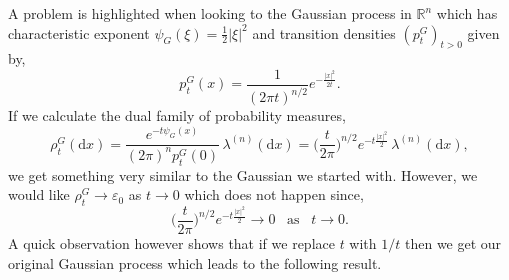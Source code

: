 \documentclass[a4paper, 12pt]{report}
\theoremstyle{remark}
\theoremstyle{definition}
\begin{document}
A problem is highlighted when looking to the Gaussian process in $\mathbb{R}^n$ which has characteristic exponent $\psi_G(\xi) = \frac{1}{2}|\xi|^2$ and transition densities $(p_t^G)_{t > 0}$ given by,
$$
p_t^G(x) = \frac{1}{(2\pi t)^{n/2}}e^{-\frac{|x|^2}{2t}}.
$$
If we calculate the dual family of probability measures,
$$
\rho_t^G(\mathrm{d}x) = \frac{e^{-t\psi_G(x)}}{(2\pi)^np_t^G(0)}\,\lambda^{(n)}(\mathrm{d}x) = \bigg(\frac{t}{2\pi}\bigg)^{n/2}e^{-t\frac{|x|^2}{2}}\,\lambda^{(n)}(\mathrm{d}x),
$$
we get something very similar to the Gaussian we started with.  However, we would like $\rho_t^G \to \varepsilon_0$ as $t \to 0$ which does not happen since,
$$
\bigg(\frac{t}{2\pi}\bigg)^{n/2}e^{-t\frac{|x|^2}{2}} \to 0 \,\,\,\,\, \text{as} \,\,\,\,\, t \to 0.
$$
A quick observation however shows that if we replace $t$ with $1/t$ then we get our original Gaussian process which leads to the following result.
\end{document}
